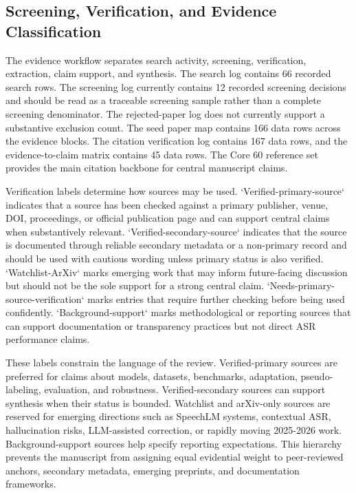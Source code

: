 \documentclass[pdflatex,sn-basic]{sn-jnl}
\theoremstyle{thmstyleone}
\theoremstyle{thmstyletwo}
\theoremstyle{thmstylethree}
\begin{document}
\subsection{Screening, Verification, and Evidence Classification}

The evidence workflow separates search activity, screening, verification, extraction, claim support, and synthesis. The search log contains 66 recorded search rows. The screening log currently contains 12 recorded screening decisions and should be read as a traceable screening sample rather than a complete screening denominator. The rejected-paper log does not currently support a substantive exclusion count. The seed paper map contains 166 data rows across the evidence blocks. The citation verification log contains 167 data rows, and the evidence-to-claim matrix contains 45 data rows. The Core 60 reference set provides the main citation backbone for central manuscript claims.

Verification labels determine how sources may be used. `Verified-primary-source` indicates that a source has been checked against a primary publisher, venue, DOI, proceedings, or official publication page and can support central claims when substantively relevant. `Verified-secondary-source` indicates that the source is documented through reliable secondary metadata or a non-primary record and should be used with cautious wording unless primary status is also verified. `Watchlist-ArXiv` marks emerging work that may inform future-facing discussion but should not be the sole support for a strong central claim. `Needs-primary-source-verification` marks entries that require further checking before being used confidently. `Background-support` marks methodological or reporting sources that can support documentation or transparency practices but not direct ASR performance claims.

These labels constrain the language of the review. Verified-primary sources are preferred for claims about models, datasets, benchmarks, adaptation, pseudo-labeling, evaluation, and robustness. Verified-secondary sources can support synthesis when their status is bounded. Watchlist and arXiv-only sources are reserved for emerging directions such as SpeechLM systems, contextual ASR, hallucination risks, LLM-assisted correction, or rapidly moving 2025-2026 work. Background-support sources help specify reporting expectations. This hierarchy prevents the manuscript from assigning equal evidential weight to peer-reviewed anchors, secondary metadata, emerging preprints, and documentation frameworks.
\end{document}
